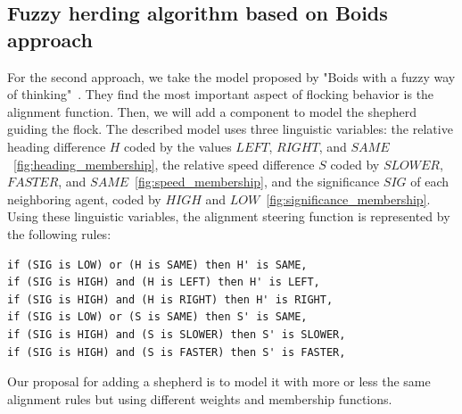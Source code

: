 \documentclass[9pt]{pnas-new}
\begin{document}
\subsection{Fuzzy herding algorithm based on Boids approach}
For the second approach, we take the model proposed by "Boids with a fuzzy way of thinking"~\cite{bajec2003boids}. They find the most important aspect of flocking behavior is the alignment function. Then, we will add a component to model the shepherd guiding the flock.
The described model uses three linguistic variables: the relative heading difference $H$ coded by the values $LEFT$, $RIGHT$, and $SAME$~\ref{fig:heading_membership}, the relative speed difference $S$ coded by $SLOWER$, $FASTER$, and $SAME$~\ref{fig:speed_membership}, and the significance $SIG$ of each neighboring agent, coded by $HIGH$ and $LOW$~\ref{fig:significance_membership}.
Using these linguistic variables, the alignment steering function is represented by the following rules:
\begin{verbatim}
if (SIG is LOW) or (H is SAME) then H' is SAME,
if (SIG is HIGH) and (H is LEFT) then H' is LEFT,
if (SIG is HIGH) and (H is RIGHT) then H' is RIGHT,
if (SIG is LOW) or (S is SAME) then S' is SAME,
if (SIG is HIGH) and (S is SLOWER) then S' is SLOWER,
if (SIG is HIGH) and (S is FASTER) then S' is FASTER,
\end{verbatim}
Our proposal for adding a shepherd is to model it with more or less the same alignment rules but using different weights and membership functions.
\end{document}
